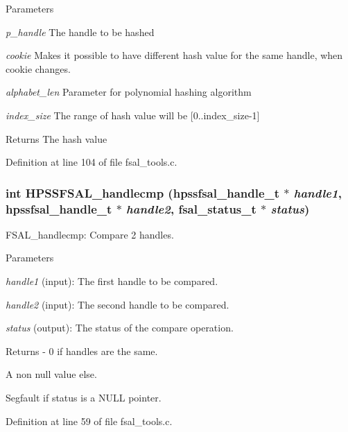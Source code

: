 \begin{DoxyParams}{Parameters}
\item[{\em p\_\-handle}]The handle to be hashed \item[{\em cookie}]Makes it possible to have different hash value for the same handle, when cookie changes. \item[{\em alphabet\_\-len}]Parameter for polynomial hashing algorithm \item[{\em index\_\-size}]The range of hash value will be [0..index\_\-size-\/1]\end{DoxyParams}
\begin{DoxyReturn}{Returns}
The hash value 
\end{DoxyReturn}


Definition at line 104 of file fsal\_\-tools.c.
\subsubsection[{HPSSFSAL\_\-handlecmp}]{\setlength{\rightskip}{0pt plus 5cm}int HPSSFSAL\_\-handlecmp (hpssfsal\_\-handle\_\-t $\ast$ {\em handle1}, \/  hpssfsal\_\-handle\_\-t $\ast$ {\em handle2}, \/  fsal\_\-status\_\-t $\ast$ {\em status})}\label{fsal__tools_8c_a3bc203e0551b743f34b8d612c218767f}
FSAL\_\-handlecmp: Compare 2 handles.


\begin{DoxyParams}{Parameters}
\item[{\em handle1}](input): The first handle to be compared. \item[{\em handle2}](input): The second handle to be compared. \item[{\em status}](output): The status of the compare operation.\end{DoxyParams}
\begin{DoxyReturn}{Returns}
-\/ 0 if handles are the same.
\begin{DoxyItemize}
\item A non null value else.
\item Segfault if status is a NULL pointer. 
\end{DoxyItemize}
\end{DoxyReturn}


Definition at line 59 of file fsal\_\-tools.c.
